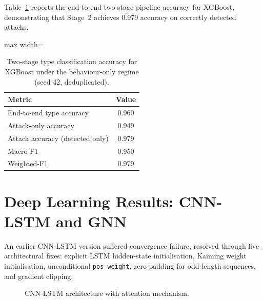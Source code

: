\documentclass[12pt,a4paper]{report}
\begin{document}
Table~\ref{tab:perclass-f1} reports the end-to-end two-stage pipeline accuracy for XGBoost, demonstrating that Stage~2 achieves 0.979 accuracy on correctly detected attacks.

\begin{table}[H]
\centering
\caption{Two-stage type classification accuracy for XGBoost under the behaviour-only regime (seed 42, deduplicated).}
\label{tab:perclass-f1}
\begin{adjustbox}{max width=\textwidth}
\begin{tabular}{lc}
\toprule
\textbf{Metric} & \textbf{Value} \\
\midrule
End-to-end type accuracy & 0.960 \\
Attack-only accuracy & 0.949 \\
Attack accuracy (detected only) & 0.979 \\
Macro-F1 & 0.950 \\
Weighted-F1 & 0.979 \\
\bottomrule
\end{tabular}
\end{adjustbox}
\end{table}

\section{Deep Learning Results: CNN-LSTM and GNN}
\label{sec:cnnlstm-results}

An earlier CNN-LSTM version suffered convergence failure, resolved through five architectural fixes: explicit LSTM hidden-state initialisation, Kaiming weight initialisation, unconditional \texttt{pos\_weight}, zero-padding for odd-length sequences, and gradient clipping.

\begin{figure}[htbp]
\centering
{}
\caption{CNN-LSTM architecture with attention mechanism.}
\label{fig:cnn-lstm-arch}
\end{figure}
\end{document}
